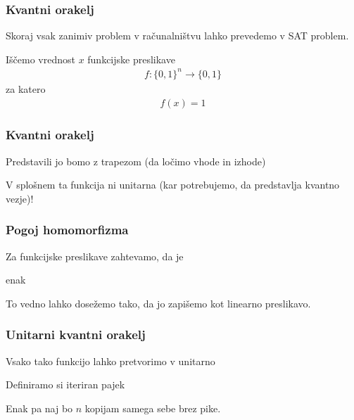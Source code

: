 \documentclass[10pt]{beamer}
\begin{document}
\begin{frame}
  \frametitle{Kvantni orakelj}
  Skoraj vsak zanimiv problem v računalništvu lahko prevedemo v SAT problem.

  Iščemo vrednost \(x\) funkcijske preslikave
  \begin{align*}
    f:\{0,1\}^n\to \{0,1\}
  \end{align*}
  za katero
  \begin{align*}
    f(x) = 1
  \end{align*}
\end{frame}
\begin{frame}
  \frametitle{Kvantni orakelj}
  Predstavili jo bomo z trapezom (da ločimo vhode in izhode)
  \begin{center}
\end{center}
  V splošnem ta funkcija ni unitarna (kar potrebujemo, da predstavlja kvantno vezje)!
\end{frame}
\begin{frame}
  \frametitle{Pogoj homomorfizma}
  Za funkcijske preslikave zahtevamo, da je
  \begin{center}
\end{center}
  enak
  \begin{center}
\end{center}
  To vedno lahko dosežemo tako, da jo zapišemo kot linearno preslikavo.
\end{frame}
\begin{frame}
  \frametitle{Unitarni kvantni orakelj}
  Vsako tako funkcijo lahko pretvorimo v unitarno
  
  Definiramo si iteriran pajek
  \begin{center}
\end{center}
  Enak pa naj bo \(n\) kopijam samega sebe brez pike. 
\end{frame}
\end{document}
